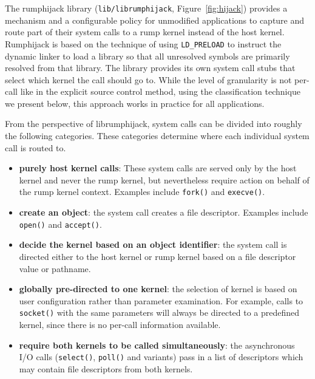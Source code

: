 The rumphijack library (\texttt{lib/librumphijack}, Figure~\ref{fig:hijack}) provides a
mechanism and a configurable policy for unmodified applications to
capture and route part of their system calls to a rump kernel
instead of the host kernel.  Rumphijack is based on the technique
of using \verb+LD_PRELOAD+ to instruct the dynamic linker to load
a library so that all unresolved symbols are primarily resolved
from that library.  The library provides its own system call stubs
that select which kernel the call should go to.  While the level
of granularity is not per-call like in the explicit source control
method, using the classification technique we present below, this
approach works in practice for all applications.

From the perspective of librumphijack, system calls can be divided
into roughly the following categories.  These categories determine
where each individual system call is routed to.

\begin{itemize}
\item	\textbf{purely host kernel calls}:
          These system calls are served only by the host kernel
          and never the rump kernel, but nevertheless require
          action on behalf of the rump kernel context.  Examples include
          \verb+fork()+ and \verb+execve()+.

\item	\textbf{create an object}: the system call creates a file descriptor.
          Examples include \verb+open()+ and \verb+accept()+.

\item	\textbf{decide the kernel based on an object identifier}: the system
          call is directed either to the host kernel or rump kernel
          based on a file descriptor value or pathname.

\item	\textbf{globally pre-directed to one kernel}: the selection of
          kernel is based on user configuration rather than parameter
          examination.  For example, calls to \verb+socket()+
          with the same parameters will always be directed to a
          predefined kernel, since there is no per-call information
          available.

\item	\textbf{require both kernels to be called simultaneously}:
	the asynchronous I/O calls (\verb+select()+, \verb+poll()+ and
	variants) pass in a list of descriptors which may contain file
	descriptors from both kernels.

\end{itemize}

